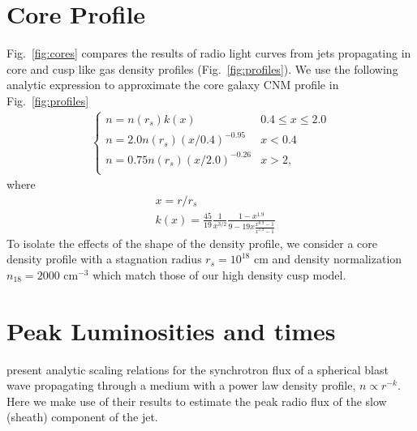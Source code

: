 \documentclass[usenatbib,fleqn]{mnras}
\begin{document}
\appendix
\section{Core Profile}
\label{app:core}
Fig.~\ref{fig:cores} compares the results of radio light curves from
jets propagating in core and cusp like gas density profiles
(Fig.~\ref{fig:profiles}).  We use the following analytic expression
to approximate the core galaxy CNM profile in Fig.~\ref{fig:profiles}
\begin{align}
\begin{cases}
n=n(r_s) k(x) & 0.4 \leq x\leq 2.0\\
n = 2.0 n(r_s) (x/0.4)^{-0.95} & x < 0.4\\
n = 0.75 n(r_s) (x/2.0)^{-0.26} & x>2,\\
\end{cases}
\label{eq:cores}
\end{align}
where
\begin{align}
  &x=r/r_s\\\nonumber
  &k(x)=\frac{45}{19} \frac{1}{x^{3/2}} \frac{1-x^{1.9}}{9-19
      x\frac{x^{0.9}-1}{x^{1.9}-1}}
\end{align}
To isolate the effects of the shape of the density profile, we
consider a core density profile with a stagnation radius $r_s=10^{18}$
cm and density normalization $n_{18}=2000$ cm$^{-3}$ which match those
of our high density cusp model.

\section{Peak Luminosities and times}
\label{app:analyt}
\citet{Leventis+2012} present analytic scaling relations for the
synchrotron flux of a spherical blast wave propagating through a
medium with a power law density profile, $n\propto r^{-k}$.  Here we
make use of their results to estimate the peak radio flux of the slow
(sheath) component of the jet.
\end{document}
